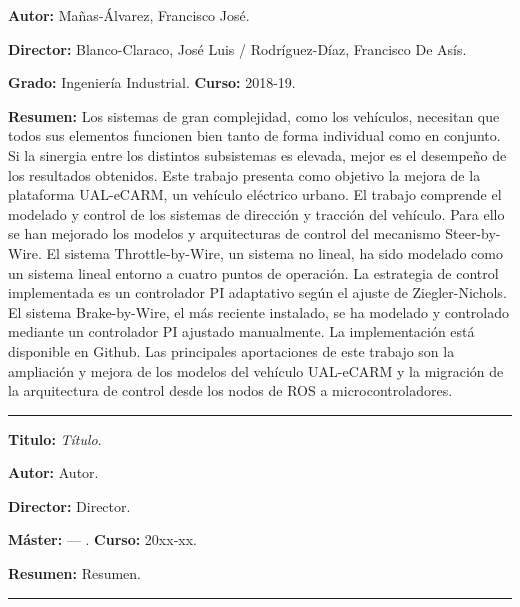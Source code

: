 \textbf{Autor:} Mañas-Álvarez, Francisco José.

\textbf{Director:} Blanco-Claraco, José Luis / Rodríguez-Díaz, Francisco De Asís.

\textbf{Grado:} Ingeniería Industrial. \textbf{Curso:} 2018-19. 

 
\textbf{Resumen:} Los sistemas de gran complejidad, como los vehículos, necesitan que todos sus elementos funcionen bien tanto de forma individual como en conjunto. Si la sinergia entre los distintos subsistemas es elevada, mejor es el desempeño de los resultados obtenidos. Este trabajo presenta como objetivo la mejora de la plataforma UAL-eCARM, un vehículo eléctrico urbano. El trabajo comprende el modelado y control de los sistemas de dirección y tracción del vehículo. Para ello se han mejorado los modelos y arquitecturas de control del mecanismo Steer-by-Wire. El sistema Throttle-by-Wire, un sistema no lineal, ha sido modelado como un sistema lineal entorno a cuatro puntos de operación. La estrategia de control implementada es un controlador PI adaptativo según el ajuste de Ziegler-Nichols. El sistema Brake-by-Wire, el más reciente instalado, se ha modelado y controlado mediante un controlador PI ajustado manualmente. La implementación está disponible en Github. Las principales aportaciones de este trabajo son la ampliación y mejora de los modelos del vehículo UAL-eCARM y la migración de la arquitectura de control desde los nodos de ROS a
microcontroladores.
 
\vspace{6pt} \hrule \vspace{6pt}

\textbf{Titulo:} \textit{Título}. %

\textbf{Autor:} Autor.

\textbf{Director:} Director.

\textbf{Máster:} --- . \textbf{Curso:} 20xx-xx. 

 
\textbf{Resumen:} Resumen.
 
\vspace{6pt} \hrule \vspace{6pt}

